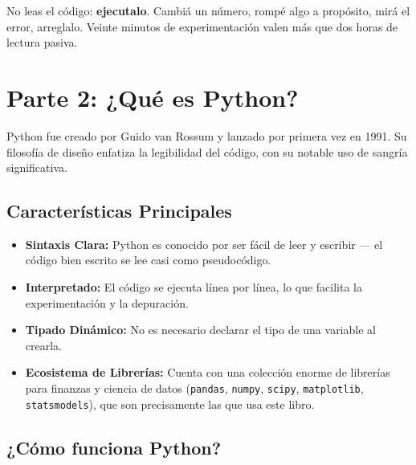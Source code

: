 \documentclass[
  spanish,
  letterpaper,
  DIV=11,
  numbers=noendperiod]{scrreprt}
\providecommand{\tightlist}{%
  \setlength{\itemsep}{0pt}\setlength{\parskip}{0pt}}
\begin{document}
\begin{tcolorbox}[enhanced jigsaw, bottomrule=.15mm, colback=white, opacitybacktitle=0.6, arc=.35mm, toprule=.15mm, opacityback=0, breakable, titlerule=0mm, left=2mm, coltitle=black, colbacktitle=quarto-callout-tip-color!10!white, colframe=quarto-callout-tip-color-frame, leftrule=.75mm, toptitle=1mm, bottomtitle=1mm, title=\textcolor{quarto-callout-tip-color}{\faLightbulb}\hspace{0.5em}{El hábito que más rinde}, rightrule=.15mm]

No leas el código: \textbf{ejecutalo}. Cambiá un número, rompé algo a
propósito, mirá el error, arreglalo. Veinte minutos de experimentación
valen más que dos horas de lectura pasiva.

\end{tcolorbox}

\section{Parte 2: ¿Qué es Python?}\label{parte-2-quuxe9-es-python}

Python fue creado por Guido van Rossum y lanzado por primera vez en
1991. Su filosofía de diseño enfatiza la legibilidad del código, con su
notable uso de sangría significativa.

\subsection{Características
Principales}\label{caracteruxedsticas-principales}

\begin{itemize}
\tightlist
\item
  \textbf{Sintaxis Clara:} Python es conocido por ser fácil de leer y
  escribir --- el código bien escrito se lee casi como pseudocódigo.
\item
  \textbf{Interpretado:} El código se ejecuta línea por línea, lo que
  facilita la experimentación y la depuración.
\item
  \textbf{Tipado Dinámico:} No es necesario declarar el tipo de una
  variable al crearla.
\item
  \textbf{Ecosistema de Librerías:} Cuenta con una colección enorme de
  librerías para finanzas y ciencia de datos (\texttt{pandas},
  \texttt{numpy}, \texttt{scipy}, \texttt{matplotlib},
  \texttt{statsmodels}), que son precisamente las que usa este libro.
\end{itemize}

\subsection{¿Cómo funciona Python?}\label{cuxf3mo-funciona-python}
\end{document}
